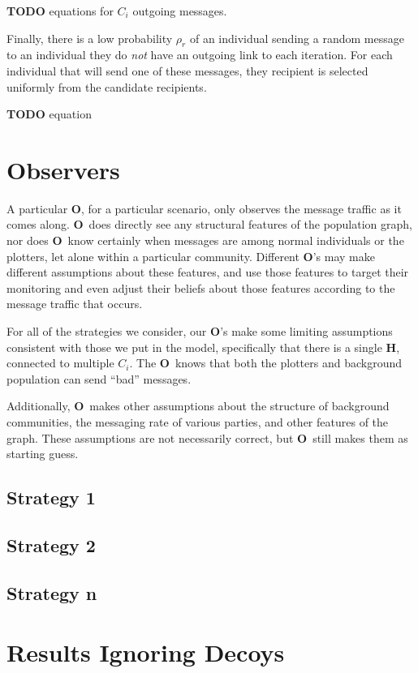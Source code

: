 \documentclass{article}
\newcommand{\Hub}[0]{\ensuremath{\mathbf{H}}}
\newcommand{\Obs}[0]{\ensuremath{\mathbf{O}}}
\begin{document}
{\bf TODO} equations for $C_i$ outgoing messages.

Finally, there is a low probability $\rho_r$ of an individual sending a random message to an individual they do {\em not} have an outgoing link to each iteration. For each individual that will send one of these messages, they recipient is selected uniformly from the candidate recipients.

{\bf TODO} equation

\section*{Observers}
A particular \Obs, for a particular scenario, only observes the message traffic as it comes along.  \Obs\ does directly see any structural features of the population graph, nor does \Obs\ know certainly when messages are among normal individuals or the plotters, let alone within a particular community.  Different \Obs's may make different assumptions about these features, and use those features to target their monitoring and even adjust their beliefs about those features according to the message traffic that occurs.

For all of the strategies we consider, our \Obs's make some limiting assumptions consistent with those we put in the model, specifically that there is a single \Hub, connected to multiple $C_i$.  The \Obs\ knows that both the plotters and background population can send ``bad'' messages.

Additionally, \Obs\ makes other assumptions about the structure of background communities, the messaging rate of various parties, and other features of the graph.  These assumptions are not necessarily correct, but \Obs\ still makes them as starting guess.

\subsection*{Strategy 1}

\subsection*{Strategy 2}

\subsection*{Strategy n}

\section*{Results Ignoring Decoys}
\end{document}
